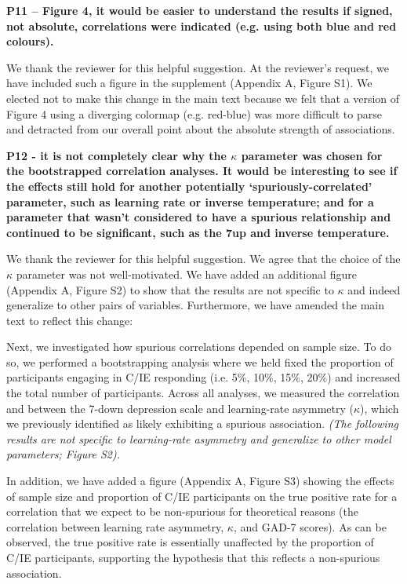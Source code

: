\documentclass[a4paper,notitlepage,12pt]{article}
\begin{document}
\textbf{P11 – Figure 4, it would be easier to understand the results if signed, not absolute, correlations were indicated (e.g. using both blue and red colours).}

We thank the reviewer for this helpful suggestion. At the reviewer's request, we have included such a figure in the supplement (Appendix A, Figure S1). We elected not to make this change in the main text because we felt that a version of Figure 4 using a diverging colormap (e.g. red-blue) was more difficult to parse and detracted from our overall point about the absolute strength of associations.

\textbf{P12 - it is not completely clear why the $\kappa$ parameter was chosen for the bootstrapped correlation analyses. It would be interesting to see if the effects still hold for another potentially `spuriously-correlated' parameter, such as learning rate or inverse temperature; and for a parameter that wasn't considered to have a spurious relationship and continued to be significant, such as the 7up and inverse temperature.}

We thank the reviewer for this helpful suggestion. We agree that the choice of the $\kappa$ parameter was not well-motivated. We have added an additional figure (Appendix A, Figure S2) to show that the results are not specific to $\kappa$ and indeed generalize to other pairs of variables. Furthermore, we have amended the main text to reflect this change:

\begin{displayquote}
Next, we investigated how spurious correlations depended on sample size. To do so, we performed a bootstrapping analysis where we held fixed the proportion of participants engaging in C/IE responding (i.e. 5\%, 10\%, 15\%, 20\%) and increased the total number of participants. Across all analyses, we measured the correlation and between the 7-down depression scale and learning-rate asymmetry ($\kappa$), which we previously identified as likely exhibiting a spurious association. \textit{(The following results are not specific to learning-rate asymmetry and generalize to other model parameters; Figure S2).}
\end{displayquote}

In addition, we have added a figure (Appendix A, Figure S3) showing the effects of sample size and proportion of C/IE participants on the true positive rate for a correlation that we expect to be non-spurious for theoretical reasons (the correlation between learning rate asymmetry, $\kappa$, and GAD-7 scores). As can be observed, the true positive rate is essentially unaffected by the proportion of C/IE participants, supporting the hypothesis that this reflects a non-spurious association.
\end{document}
